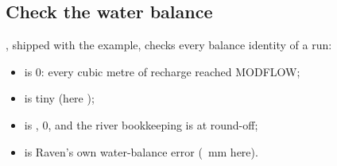 \subsection{Check the water balance}
, shipped with the example, checks every balance identity of a run:
\begin{tocheck}
\begin{itemize}
\item {} is 0: every cubic metre of recharge reached MODFLOW;
\item {} is tiny (here );
\item {} is ,  0, and the river bookkeeping is at round-off;
\item {} is Raven's own water-balance error (~mm here).
\end{itemize}
\end{tocheck}

